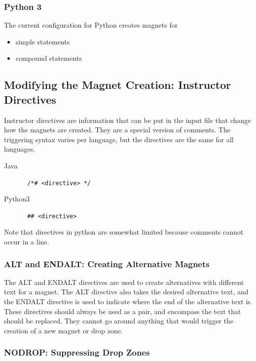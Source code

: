 \documentclass[letter,10pt]{article}
\begin{document}
\subsubsection{Python 3}
The current configuration for Python creates magnets for
\begin{itemize}
 \item simple statements
 \item compound statements
\end{itemize}


\subsection{Modifying the Magnet Creation: Instructor Directives}
Instructor directives are information that can be put in the input file 
that change how the magnets are created. They are a special version of 
comments. The triggering syntax varies per language, but the directives 
are the same for all languages.

\begin{description}
 \item [Java] \verb~ /*# <directive> */~
 \item [Python3] \verb~ ## <directive>~
\end{description}



Note that directives in python are somewhat limited because comments 
cannot occur in a line. 

\subsubsection{ALT and ENDALT: Creating Alternative Magnets}

The ALT and ENDALT directives are used to create alternatives with 
different text for a magnet. The ALT directive also takes the desired 
alternative text, and the ENDALT directive is used to indicate where 
the end of the alternative text is. These directives should always be 
used as a pair, and encompass the text that should be replaced. They 
cannot go around anything that would trigger the creation of a new 
magnet or drop zone.


\subsubsection{NODROP: Suppressing Drop Zones}
\end{document}
